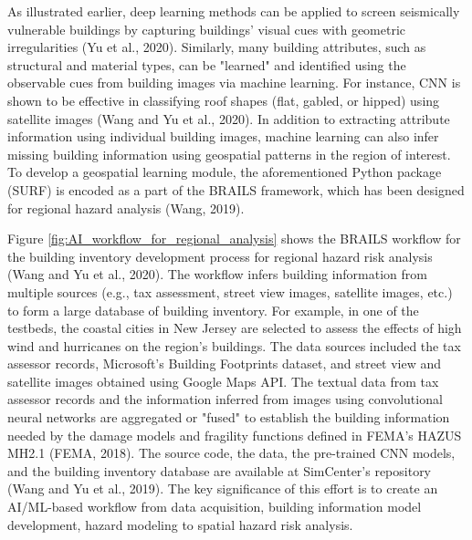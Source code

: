 As illustrated earlier, deep learning methods can be applied to screen seismically vulnerable buildings by capturing buildings' visual cues with geometric irregularities (Yu et al., 2020). Similarly, many building attributes, such as structural and material types, can be "learned" and identified using the observable cues from building images via machine learning. For instance, CNN is shown to be effective in classifying roof shapes (flat, gabled, or hipped) using satellite images (Wang and Yu et al., 2020). In addition to extracting attribute information using individual building images, machine learning can also infer missing building information using geospatial patterns in the region of interest. To develop a geospatial learning module, the aforementioned Python package (SURF) is encoded as a part of the BRAILS framework, which has been designed for regional hazard analysis (Wang, 2019). 

Figure \ref{fig:AI_workflow_for_regional_analysis} shows the BRAILS workflow for the building inventory development process for regional hazard risk analysis (Wang and Yu et al., 2020). The workflow infers building information from multiple sources (e.g., tax assessment, street view images, satellite images, etc.) to form a large database of building inventory. For example, in one of the testbeds, the coastal cities in New Jersey are selected to assess the effects of high wind and hurricanes on the region's buildings. The data sources included the tax assessor records, Microsoft's Building Footprints dataset, and street view and satellite images obtained using Google Maps API. The textual data from tax assessor records and the information inferred from images using convolutional neural networks are aggregated or "fused" to establish the building information needed by the damage models and fragility functions defined in FEMA's HAZUS MH2.1 (FEMA, 2018). The source code, the data, the pre-trained CNN models, and the building inventory database are available at SimCenter's repository (Wang and Yu et al., 2019). The key significance of this effort is to create an AI/ML-based workflow from data acquisition, building information model development, hazard modeling to spatial hazard risk analysis. 

